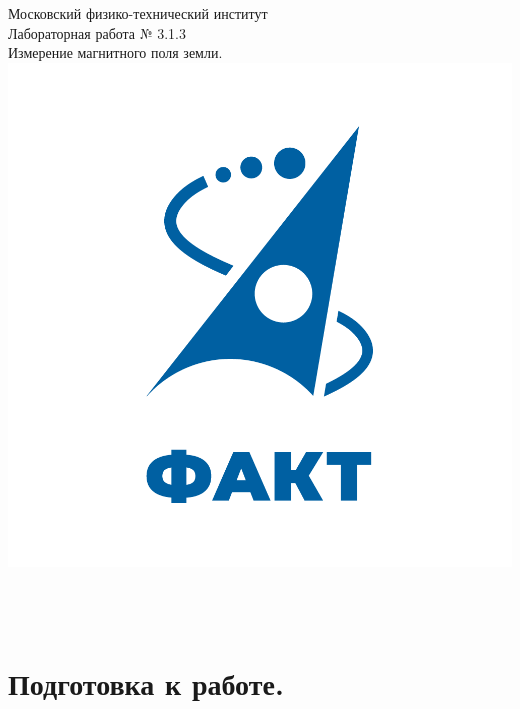 \documentclass[a4paper,12pt]{article} %
\begin{document}

\begin{titlepage}
\begin{center}
	\large{Московский физико-технический институт}\\
	\vspace{100px}
	\LARGE{Лабораторная работа № 3.1.3}\\
	\LARGE{Измерение магнитного поля земли.}\\
	\vspace{30px}
	\includegraphics[scale = 0.3]{fakt_logo.png}\\
\end{center}

\vfill
\begin{flushright}
	\\
	\\
\end{flushright}
\end{titlepage}

\newpage

\tableofcontents

\newpage

\newpage

\section{Подготовка к работе.}
\end{document}
